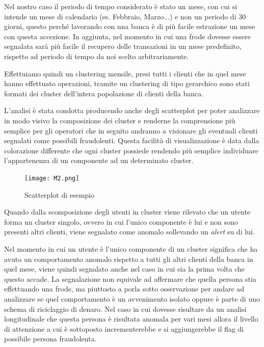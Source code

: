 Nel nostro caso il periodo di tempo considerato è stato un mese, con cui si intende un mese di calendario (es. Febbraio, Marzo...) e non un periodo di 30 giorni, questo perché lavorando con una banca è di più facile estrazione un mese con questa accezione. In aggiunta, nel momento in cui una frode dovesse essere segnalata sarà più facile il recupero delle transazioni in un mese predefinito, rispetto ad periodo di tempo da noi scelto arbitrariamente.

Effettuiamo quindi un clustering mensile, presi tutti i clienti che in quel mese hanno effettuato operazioni, tramite un clustering di tipo gerarchico sono stati formati dei cluster dell'intera popolazione di clienti della banca. 

L'analisi è stata condotta producendo anche degli scatterplot per poter analizzare in modo visivo la composizione dei cluster e renderne la comprensione più semplice per gli operatori che in seguito andranno a visionare gli eventuali clienti segnalati come possibili fraudolenti.
Questa facilità di visualizzazione è data dalla colorazione differente che ogni cluster possiede rendendo più semplice individuare l'appartenenza di un componente ad un determinato cluster.

\begin{figure}[H]
    \texttt{[image: M2.png]}
    \centering
    \caption{Scatterplot di esempio}
    \label{fig:esScatter}
\end{figure}

Quando dalla scomposizione degli utenti in cluster viene rilevato che un utente forma un cluster singolo, ovvero in cui l’unico componente è lui e non sono presenti altri clienti, viene segnalato come anomalo sollevando un \textit{alert} su di lui.

Nel momento in cui un utente è l’unico componente di un cluster significa che ha avuto un comportamento anomalo rispetto a tutti gli altri clienti della banca in quel mese, viene quindi segnalato anche nel caso in cui sia la prima volta che questo accade. La segnalazione non equivale ad affermare che quella persona stia effettuando una frode, ma piuttosto a porla sotto osservazione per andare ad analizzare se quel comportamento è un avvenimento isolato oppure è parte di uno schema di riciclaggio di denaro.
Nel caso in cui dovesse risultare da un analisi longitudinale che questa persona è risultata anomala per vari mesi allora il livello di attenzione a cui è sottoposto incrementerebbe e si aggiungerebbe il flag di possibile persona fraudolenta.

